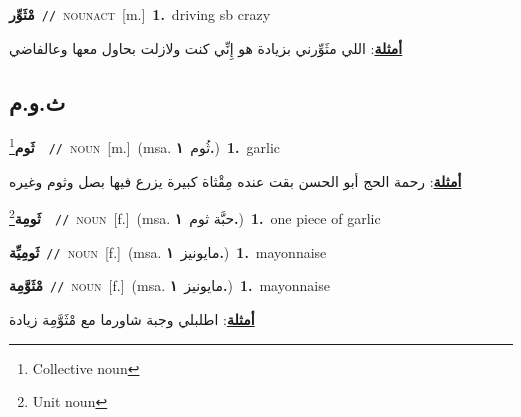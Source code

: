 \documentclass[10pt,a4paper,twoside]{article} %
\begin{document}
\begin{multicols}{2}
{\setlength\topsep{0pt}\textbf{\foreignlanguage{arabic}{مْثَوِّر}}\ {\color{gray}\texttt{//}\color{black}}\ \textsc{noun\textunderscore act}\ [m.]\ \textbf{1.}~driving sb crazy\  \begin{flushright}\color{gray}\foreignlanguage{arabic}{\textbf{\underline{\foreignlanguage{arabic}{أمثلة}}}: اللي مثَوِّرني بزيادة هو إِنِّي كنت ولازلت بحاول معها وعالفاضي}\end{flushright}\color{black}} \vspace{2mm}

\vspace{-3mm}
\subsection*{\color{blue}\foreignlanguage{arabic}{ث.و.م}\color{blue}{}} 

{\setlength\topsep{0pt}\textbf{\foreignlanguage{arabic}{ثَوم}}\footnote{Collective noun}\ \ {\color{gray}\texttt{//}\color{black}}\ \textsc{noun}\ [m.]\ \color{gray}(msa. \foreignlanguage{arabic}{ثُوم}~\foreignlanguage{arabic}{\textbf{١.}})\color{black}\ \textbf{1.}~garlic\  \begin{flushright}\color{gray}\foreignlanguage{arabic}{\textbf{\underline{\foreignlanguage{arabic}{أمثلة}}}: رحمة الحج أبو الحسن بقت عنده مِقْثاة كبيرة يزرع فيها بصل وثوم وغيره}\end{flushright}\color{black}} \vspace{2mm}

{\setlength\topsep{0pt}\textbf{\foreignlanguage{arabic}{ثَومِة}}\footnote{Unit noun}\ \ {\color{gray}\texttt{//}\color{black}}\ \textsc{noun}\ [f.]\ \color{gray}(msa. \foreignlanguage{arabic}{حبَّة ثوم}~\foreignlanguage{arabic}{\textbf{١.}})\color{black}\ \textbf{1.}~one piece of garlic\ } \vspace{2mm}

{\setlength\topsep{0pt}\textbf{\foreignlanguage{arabic}{ثَومِيِّة}}\ {\color{gray}\texttt{//}\color{black}}\ \textsc{noun}\ [f.]\ \color{gray}(msa. \foreignlanguage{arabic}{مايونيز}~\foreignlanguage{arabic}{\textbf{١.}})\color{black}\ \textbf{1.}~mayonnaise\ } \vspace{2mm}

{\setlength\topsep{0pt}\textbf{\foreignlanguage{arabic}{مْثَوَّمِة}}\ {\color{gray}\texttt{//}\color{black}}\ \textsc{noun}\ [f.]\ \color{gray}(msa. \foreignlanguage{arabic}{مايونيز}~\foreignlanguage{arabic}{\textbf{١.}})\color{black}\ \textbf{1.}~mayonnaise\  \begin{flushright}\color{gray}\foreignlanguage{arabic}{\textbf{\underline{\foreignlanguage{arabic}{أمثلة}}}: اطلبلي وجبة شاورما مع مْثَوَّمِة زيادة}\end{flushright}\color{black}} \vspace{2mm}

\end{multicols}
\end{document}
